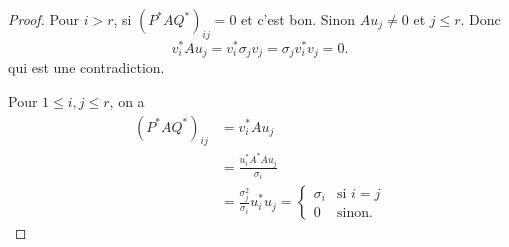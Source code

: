 \begin{proof}
Pour $i>r$, si $(P^{*}AQ^{*})_{ij}=0$ et c'est bon. Sinon $Au_{j}\neq0$ et $j\le r$. Donc
$$
v_{i}^{*}Au_{j}=v_{i}^{*}\sigma _{j}v_{j}=\sigma _{j}v_{i}^{*}v_{j}=0.
$$
qui est une contradiction.

Pour $1\le i,j\le r$, on a
\begin{align*}
(P^{*}AQ^{*})_{ij} & =v_{i}^{*}Au_{j} \\
 & =\frac{u_{i}^{*}A^{*}Au_{j}}{\sigma _{i}} \\
 & =\frac{\sigma _{j}^{2}}{\sigma _{i}}u_{i}^{*}u_{j}=\begin{cases} 
\sigma _{i} & \text{si }i=j \\
0 & \text{sinon}.
\end{cases}
\end{align*}
\end{proof}

